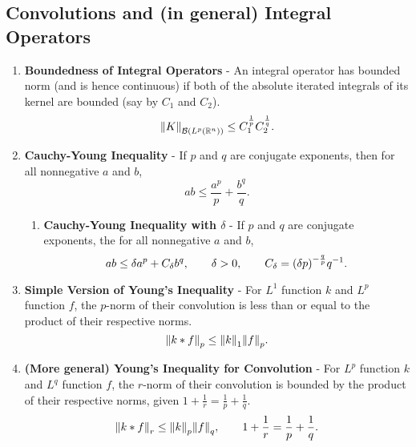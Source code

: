 \documentclass{article}
\begin{document}
    \subsection{Convolutions and (in general) Integral Operators}
    \begin{enumerate}
        \item \textbf{Boundedness of Integral Operators} - An integral operator has bounded norm (and is hence continuous) if both of the absolute iterated integrals of its kernel are bounded (say by $C_1$ and $C_2$). $$\norm{K}_{\mathcal{B}(L^p(\mathbb{R}^n))} \leq C_1^\frac{1}{p}C_2^\frac{1}{q}.$$
        \item \textbf{Cauchy-Young Inequality} - If $p$ and $q$ are conjugate exponents, then for all nonnegative $a$ and $b$, $$ab \leq \frac{a^p}{p} + \frac{b^q}{q}.$$
        \begin{enumerate}
            \item \textbf{Cauchy-Young Inequality with $\delta$} - If $p$ and $q$ are conjugate exponents, the for all nonnegative $a$ and $b$, $$ab \leq \delta a^p + C_\delta b^q, \qquad \delta > 0, \qquad C_\delta = \qty(\delta p)^{-\frac{q}{p}}q^{-1}.$$
        \end{enumerate}
        \item \textbf{Simple Version of Young's Inequality} - For $L^1$ function $k$ and $L^p$ function $f$, the $p$-norm of their convolution is less than or equal to the product of their respective norms.  $$\norm{k * f}_p \leq \norm{k}_1 \norm{f}_p.$$
        \item \textbf{(More general) Young's Inequality for Convolution} - For $L^p$ function $k$ and $L^q$ function $f$, the $r$-norm of their convolution is bounded by the product of their respective norms, given $1 + \frac{1}{r} = \frac{1}{p} + \frac{1}{q}$.  $$\norm{k * f}_r \leq \norm{k}_p\norm{f}_q, \qquad 1 + \frac{1}{r} = \frac{1}{p} + \frac{1}{q}.$$
    \end{enumerate}
\end{document}
